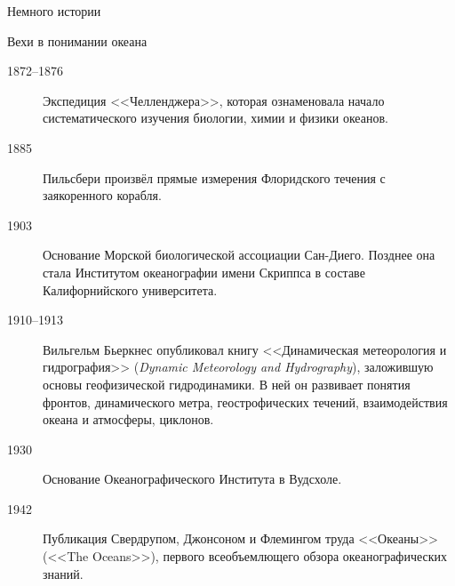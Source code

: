 \begin{chapter}{Немного истории}
\begin{section}{Вехи в понимании океана}
\begin{description}
\item[1872--1876] Экспедиция <<Челленджера>>, которая ознаменовала начало
систематического изучения биологии, химии и физики океанов.
%


\item[1885] Пильсбери произвёл прямые измерения Флоридского течения с
заякоренного корабля.
%


\item[1903] Основание Морской биологической ассоциации Сан-Диего.
Позднее она стала Институтом океанографии имени Скриппса в составе
Калифорнийского университета.
%

\item[1910--1913] Вильгельм Бьеркнес опубликовал
книгу <<Динамическая метеорология и гидрография>> (\textsl{Dynamic Meteorology
and Hydrography}), заложившую основы геофизической гидродинамики. В ней
он развивает понятия фронтов, динамического метра, геострофических течений,
взаимодействия океана и атмосферы, циклонов.
%


\item[1930] Основание Океанографического Института в Вудсхоле.
%


\item[1942] Публикация Свердрупом, Джонсоном и Флемингом труда
<<Океаны>> (<<The Oceans>>), первого всеобъемлющего обзора
океанографических знаний.
%



\end{description}
\end{section}
\end{chapter}
